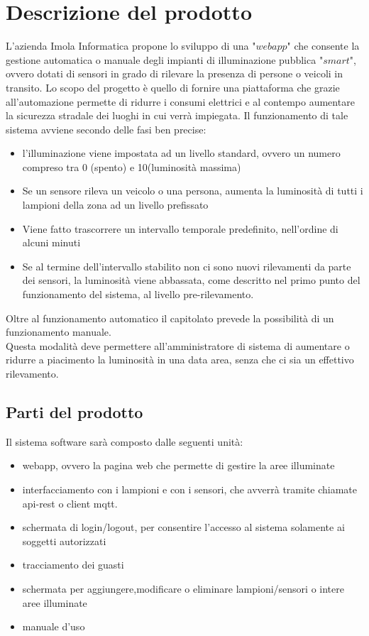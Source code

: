 \documentclass[12pt]{article}
\begin{document}
\section{Descrizione del prodotto}
L'azienda Imola Informatica propone lo sviluppo di una "$webapp$" che consente la gestione automatica o manuale degli impianti di illuminazione pubblica "$smart$", ovvero dotati di sensori in grado di rilevare la presenza di persone o veicoli in transito.
Lo scopo del progetto è quello di fornire una piattaforma che grazie all'automazione permette di ridurre i consumi elettrici e al contempo aumentare la sicurezza stradale dei luoghi in cui verrà impiegata.
Il funzionamento di tale sistema avviene secondo delle fasi ben precise:
\begin{itemize}
	\item l'illuminazione viene impostata ad un livello standard, ovvero un numero compreso tra 0 (spento) e 10(luminosità massima)
	\item Se un sensore rileva un veicolo o una persona, aumenta la luminosità di tutti i lampioni della zona ad un livello prefissato
	\item Viene fatto trascorrere un intervallo temporale predefinito, nell'ordine di alcuni minuti
	\item Se al termine dell'intervallo stabilito non ci sono nuovi rilevamenti da parte dei sensori, la luminosità viene abbassata, come descritto nel primo punto del funzionamento del sistema, al livello pre-rilevamento.
\end{itemize}
Oltre al funzionamento automatico il capitolato prevede la possibilità di un funzionamento manuale. \\
Questa modalità deve permettere all'amministratore di sistema di aumentare o ridurre a piacimento la luminosità in una data area, senza che ci sia un effettivo rilevamento.

\subsection{Parti del prodotto}
Il sistema software sarà composto dalle seguenti unità:
\begin{itemize}
	\item webapp, ovvero la pagina web che permette di gestire la aree illuminate
	\item interfacciamento con i lampioni e con i sensori, che avverrà tramite chiamate api-rest o client mqtt.
	\item schermata di login/logout, per consentire l'accesso al sistema solamente ai soggetti autorizzati
	\item tracciamento dei guasti
	\item schermata per aggiungere,modificare o eliminare lampioni/sensori o intere aree illuminate
	\item manuale d'uso
\end{itemize}
\end{document}

